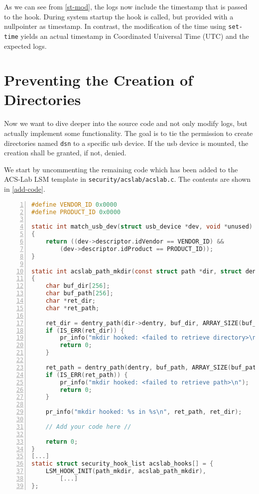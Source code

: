 \documentclass{semdoc}
\begin{document}
As we can see from \cref{st-mod}, the logs now include the timestamp that is passed to the hook.
During system startup the hook is called, but provided with a nullpointer as timestamp. 
In contrast, the modification of the time using \texttt{set-time} yields an actual timestamp in Coordinated Universal Time (UTC) and the expected logs. 

\section{Preventing the Creation of Directories}

Now we want to dive deeper into the source code and not only modify logs, but actually implement some functionality.
The goal is to tie the permission to create directories named \texttt{dsn} to a specific usb device.
If the usb device is mounted, the creation shall be granted, if not, denied.

We start by uncommenting the remaining code which has been added to the ACS-Lab LSM template in \texttt{security/acslab/acslab.c}. 
The contents are shown in \cref{add-code}. 

\begin{lstlisting}[language=c, numbers=left, caption={Additional code in \texttt{security/acslab/acslab.c}}, label={add-code}]
#define VENDOR_ID 0x0000
#define PRODUCT_ID 0x0000

static int match_usb_dev(struct usb_device *dev, void *unused)
{
	return ((dev->descriptor.idVendor == VENDOR_ID) &&
		(dev->descriptor.idProduct == PRODUCT_ID));
}

static int acslab_path_mkdir(const struct path *dir, struct dentry *dentry, umode_t mode)
{
	char buf_dir[256];
	char buf_path[256];
	char *ret_dir;
	char *ret_path;

	ret_dir = dentry_path(dir->dentry, buf_dir, ARRAY_SIZE(buf_dir));
	if (IS_ERR(ret_dir)) {
		pr_info("mkdir hooked: <failed to retrieve directory>\n");
		return 0;
	}

	ret_path = dentry_path(dentry, buf_path, ARRAY_SIZE(buf_path));
	if (IS_ERR(ret_path)) {
		pr_info("mkdir hooked: <failed to retrieve path>\n");
		return 0;
	}

	pr_info("mkdir hooked: %s in %s\n", ret_path, ret_dir);

	// Add your code here //

	return 0;
}
[...]
static struct security_hook_list acslab_hooks[] = {
	LSM_HOOK_INIT(path_mkdir, acslab_path_mkdir),
        [...]
};
\end{lstlisting}
\end{document}
